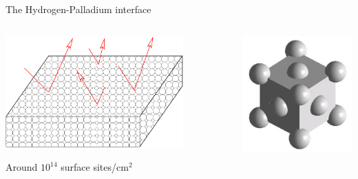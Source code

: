 \documentclass[12pt,a4paper]{beamer}
\begin{document}
\begin{CJK*}{UTF8}{gkai}
\begin{frame}{The Hydrogen-Palladium interface}
\begin{columns}
  \begin{column}{.6\textwidth}
    \includegraphics[width=0.8\textwidth]{figs/bounce.pdf}
    \smallskip

    Around $10^{14}$ surface sites/cm$^2$
  \end{column}
\pause
  \begin{column}{.3\textwidth}
    \includegraphics[width=\textwidth]{figs/fcc.jpg}
  \end{column}
\end{columns}
\end{frame}


\end{CJK*}
\end{document}
